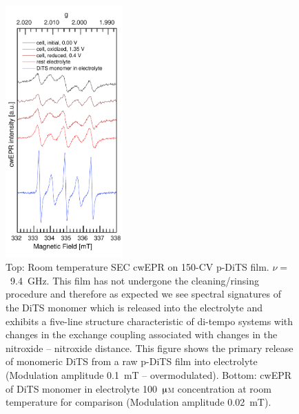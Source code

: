 \begin{figure}[H]
\centering
\includegraphics[width=0.40\textwidth]{./operando_epr/figures/Figure_S5}
\caption{Top: Room temperature SEC cwEPR on 150-CV p-DiTS film. $\nu=$~9.4~GHz. This film has not undergone the cleaning/rinsing procedure and therefore as expected we see spectral signatures of the DiTS monomer which is released into the electrolyte and exhibits a five-line structure characteristic of di-tempo systems with changes in the exchange coupling associated with changes in the nitroxide -- nitroxide distance. This figure shows the primary release of monomeric DiTS from a raw p-DiTS film into electrolyte (Modulation amplitude 0.1~mT -- overmodulated). Bottom: cwEPR of DiTS monomer in electrolyte 100~$\muup$\textsc{m} concentration at room temperature for comparison (Modulation amplitude 0.02~mT).}
\label{fig:S5}
\end{figure}
